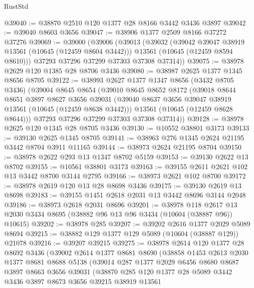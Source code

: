 \begin{lexlean}{RustStd}
\begin{coremodule}
@39040 := @38870 @2510 @120 @1377 @28 @8166 @3442 @3436 @3897
@39042 := @39040 @8603 @3656
@39047 := @38906 @1377 @2509 @8166 @37272 @37276
@39069 := @39000
    (@39006
      (@39013
        (@39032
          (@39042 @39047 @38919 @13561 (@10645 (@12459 @8604 @3442)))
          @13561
          (@10645 (@12459 @8594 @8610)))
        @37293
        @37296
        @37299
        @37303
        @37308
        @37314))
@39075 := @38978 @2629 @120 @1385 @28 @8706 @3436
@39080 := @38987 @2625 @1377 @1345 @8656 @8705
@39122 := @38993
    @2627
    @1377
    @1347
    @8656
    (@3432 @8705 @3436)
    (@39004
      @8645
      @8654
      (@39010
        @8645
        @8652
        @8172
        (@39018
          @8644
          @8651
          @3897
          @8627
          @3656
          @39031
          (@39040 @8637 @3656 @39047 @38919 @13561 (@10645 (@12459 @8638 @3442)))
          @13561
          (@10645 (@12459 @8628 @8644)))
        @37293
        @37296
        @37299
        @37303
        @37308
        @37314))
@39128 := @38978 @2625 @120 @1345 @28 @8705 @3436
@39130 := @10552 @38801 @3173
@39133 := @39130 @2625 @1345 @8705
@39141 := @38963 @276 @1345 @2624 @21195 @3442 @8704 @3911 @11165
@39144 := @38973 @2624 @21195 @8704
@39150 := @38978 @2622 @293 @13 @1347 @8702 @5159
@39153 := @39130 @2622 @13 @8702
@39155 := @10561 @38801 @3173
@39163 := @39155 @2611 @2621 @102 @13 @3442 @8700 @3144 @2795
@39166 := @38973 @2621 @102 @8700
@39172 := @38978 @2619 @120 @13 @28 @8698 @3436
@39175 := @39130 @2619 @13 @8698
@39183 := @39155 @1451 @2618 @2031 @13 @3442 @8696 @3144 @2048
@39186 := @38973 @2618 @2031 @8696
@39201 := @38978
    @118
    @2617
    @13
    @2030
    @3434
    @8695
    (@38882 @96 @13 @96 @3434 (@10604 (@38887 @96)) @10615)
@39202 := @38978 @285
@39207 := @39202 @2616 @1377 @2029 @5089 @8694
@39215 := @38882 @129 @1377 @129 @5089 (@10604 (@38887 @129)) @21078
@39216 := @39207 @39215
@39275 := @38978
    @2614
    @120
    @1377
    @28
    @8692
    @3436
    (@39002
      @2614
      @1377
      @8681
      @8690
      (@38858
        @1453
        @2613
        @2030
        @1377
        @8681
        @8688
        @5138
        (@39014
          @287
          @1377
          @2029
          @6456
          @8680
          @8687
          @3897
          @8663
          @3656
          @39031
          (@38870
            @285
            @120
            @1377
            @28
            @5089
            @3442
            @3436
            @3897
            @8673
            @3656
            @39215
            @38919
            @13561

\end{coremodule}
\end{lexlean}
